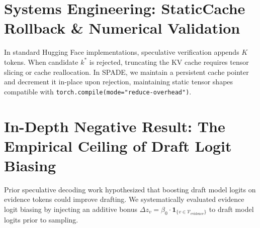 \documentclass[11pt]{article}
\begin{document}
\section{Systems Engineering: StaticCache Rollback \& Numerical Validation}
\label{app:systems}

In standard Hugging Face implementations, speculative verification appends $K$ tokens. When candidate $k^*$ is rejected, truncating the KV cache requires tensor slicing or cache reallocation. In SPADE, we maintain a persistent cache pointer and decrement it in-place upon rejection, maintaining static tensor shapes compatible with \texttt{torch.compile(mode="reduce-overhead")}.

\begin{table}[ht]
\centering
\small
{}
\caption{\textbf{Numerical Agreement Validation:} Empirical agreement between FP64 and FP32 fast math implementations across 15 rollout sequences (1,194 evaluated candidate tokens, 934 accepted tokens matching $\alpha = 78.20\%$), confirming zero token decision divergences and per-token $\text{KL} < 10^{-12}$ between numeric precisions.}
\label{tab:fp32_validation}
\end{table}

\section{In-Depth Negative Result: The Empirical Ceiling of Draft Logit Biasing}
\label{app:biasing}
Prior speculative decoding work hypothesized that boosting draft model logits on evidence tokens could improve drafting. We systematically evaluated evidence logit biasing by injecting an additive bonus $\Delta z_v = \beta_0 \cdot \mathbf{1}_{\{v \in \mathcal{V}_{\text{evidence}}\}}$ to draft model logits prior to sampling.
\end{document}
